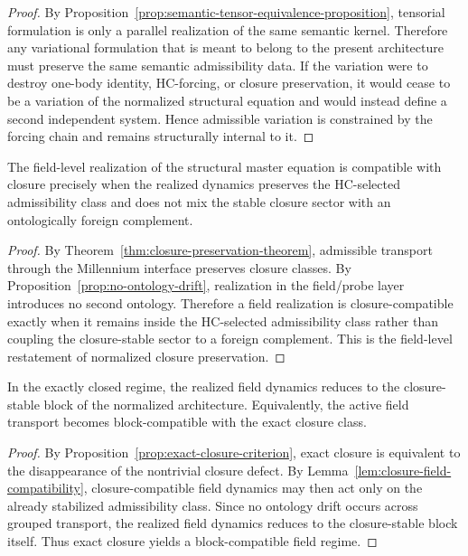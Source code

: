 \begin{proof}
By Proposition~\ref{prop:semantic-tensor-equivalence-proposition}, tensorial formulation is
only a parallel realization of the same semantic kernel. Therefore any
variational formulation that is meant to belong to the present architecture must
preserve the same semantic admissibility data. If the variation were to destroy
one-body identity, HC-forcing, or closure preservation, it would cease to be a
variation of the normalized structural equation and would instead define a
second independent system. Hence admissible variation is constrained by the
forcing chain and remains structurally internal to it.
\end{proof}

\begin{lemma}
\label{lem:closure-field-compatibility}
The field-level realization of the structural master equation is compatible with
closure precisely when the realized dynamics preserves the HC-selected
admissibility class and does not mix the stable closure sector with an
ontologically foreign complement.
\end{lemma}

\begin{proof}
By Theorem~\ref{thm:closure-preservation-theorem}, admissible transport through
the Millennium interface preserves closure classes. By Proposition~\ref{prop:no-ontology-drift},
realization in the field/probe layer introduces no second ontology. Therefore a
field realization is closure-compatible exactly when it remains inside the
HC-selected admissibility class rather than coupling the closure-stable sector
to a foreign complement. This is the field-level restatement of normalized
closure preservation.
\end{proof}

\begin{theorem}
\label{thm:exact-closure-field-theorem}
In the exactly closed regime, the realized field dynamics reduces to the
closure-stable block of the normalized architecture. Equivalently, the active
field transport becomes block-compatible with the exact closure class.
\end{theorem}

\begin{proof}
By Proposition~\ref{prop:exact-closure-criterion}, exact closure is equivalent
to the disappearance of the nontrivial closure defect. By
Lemma~\ref{lem:closure-field-compatibility}, closure-compatible field dynamics
may then act only on the already stabilized admissibility class. Since no
ontology drift occurs across grouped transport, the realized field dynamics
reduces to the closure-stable block itself. Thus exact closure yields a
block-compatible field regime.
\end{proof}

